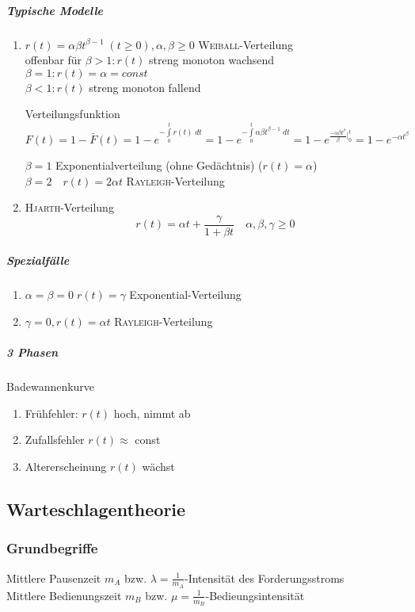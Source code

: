 \documentclass[a4paper]{scrartcl}
\begin{document}
\subparagraph{Typische Modelle}
\begin{enumerate}
\item $r(t) = \alpha \beta t^{\beta -1} \; (t\geq 0), \alpha,\beta \geq 0$ \textsc{Weiball}-Verteilung\\
offenbar für $\beta > 1: r(t)$ streng monoton wachsend\\
$\beta = 1: r(t)=\alpha = const$\\
$\beta < 1: r(t)$ streng monoton fallend

Verteilungsfunktion $F(t) = 1- \bar{F}(t) = 1- e^{-\int\limits_0^t r(t) \; dt} = 1 - e^{-\int\limits_0^t \alpha \beta t^{\beta -1} \; dt} = 1- e^{\frac{-\alpha \beta t^\beta}{\beta}|_0^t} = 1 - e^{-\alpha t^\beta}$

$\beta = 1$ Exponentialverteilung (ohne Gedächtnis) ($r(t) = \alpha$)\\
$\beta = 2 \quad r(t) = 2 \alpha t$ \textsc{Rayleigh}-Verteilung
\item \textsc{Hjarth}-Verteilung
\[ r(t) = \alpha t + \frac{\gamma}{1 + \beta t}\quad \alpha,\beta,\gamma \geq 0\]
\end{enumerate}
\subparagraph{Spezialfälle}
\begin{enumerate}
\item $\alpha = \beta = 0 \; r(t) = \gamma$ Exponential-Verteilung
\item $\gamma = 0, r(t) = \alpha t$ \textsc{Rayleigh}-Verteilung
\end{enumerate}

\subparagraph{3 Phasen} Badewannenkurve
\begin{enumerate}
\item Frühfehler: $r(t)$ hoch, nimmt ab
\item Zufallsfehler $r(t) \approx$ const
\item Altererscheinung $r(t)$ wächst

\end{enumerate}

\subsection{Warteschlagentheorie}
\subsubsection{Grundbegriffe}
Mittlere Pausenzeit $m_A$ bzw. $\lambda = \frac{1}{m_A}$-Intensität des Forderungsstroms\\
Mittlere Bedienungszeit $m_B$ bzw. $\mu = \frac{1}{m_B}$-Bedieungsintensität
\end{document}
